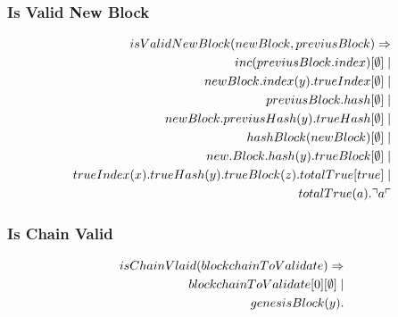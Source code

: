 \subsubsection{Is Valid New Block}

\begin{align*}
    isValidNewBlock(newBlock, previusBlock) \Rightarrow\\
    inc(previusBlock.index)[\mathbf{\emptyset}] \mid \\
    newBlock.index(y).trueIndex[\mathbf{\emptyset}] \mid \\
    previusBlock.hash[\mathbf{\emptyset}] \mid \\
    newBlock.previusHash(y).trueHash[\mathbf{\emptyset}] \mid \\
    hashBlock(newBlock)[\mathbf{\emptyset}] \mid \\
    new.Block.hash(y).trueBlock[\mathbf{\emptyset}] \mid \\
    trueIndex(x).trueHash(y).trueBlock(z).totalTrue[true] \mid \\
    totalTrue(a).\urcorner a \ulcorner
\end{align*}

\subsubsection{Is Chain Valid}

\begin{align*}
    isChainVlaid(blockchainToValidate) \Rightarrow\\
    blockchainToValidate[0][\mathbf{\emptyset}] \mid \\
    genesisBlock(y).
\end{align*}


